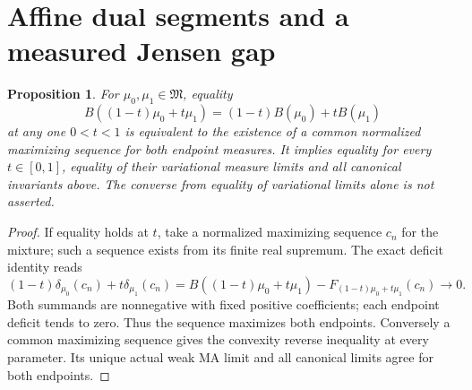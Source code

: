 \documentclass[11pt]{article}
\newtheorem{proposition}[theorem]{Proposition}
\newcommand{\M}{\mathfrak M}
\begin{document}
\section{Affine dual segments and a measured Jensen gap}
\begin{proposition}\label{affine}
For $\mu_0,\mu_1\in\M$, equality
\[
 B((1-t)\mu_0+t\mu_1)=(1-t)B(\mu_0)+tB(\mu_1)
\]
at any one $0<t<1$ is equivalent to the existence of a common
normalized maximizing sequence for both endpoint measures.
It implies equality for every $t\in[0,1]$, equality of their
variational measure limits and all canonical invariants above.
The converse from equality of variational limits alone is not asserted.
\end{proposition}
\begin{proof}
If equality holds at $t$, take a normalized maximizing sequence $c_n$
for the mixture; such a sequence exists from its finite real supremum.
The exact deficit identity reads
\[
 (1-t)\delta_{\mu_0}(c_n)+t\delta_{\mu_1}(c_n)
 =B((1-t)\mu_0+t\mu_1)-F_{(1-t)\mu_0+t\mu_1}(c_n)\to0.
\]
Both summands are nonnegative with fixed positive coefficients;
each endpoint deficit tends to zero. Thus the sequence maximizes
both endpoints. Conversely a common maximizing sequence gives the
convexity reverse inequality at every parameter. Its unique actual
weak MA limit and all canonical limits agree for both endpoints.
\end{proof}
\end{document}
